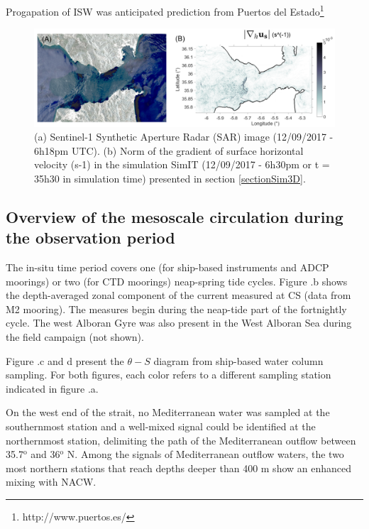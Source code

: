 \color{red}Progapation of ISW was anticipated prediction from Puertos del Estado\footnote{http://www.puertos.es/} \color{black}

\begin{figure}[!h]
 \includegraphics[width=\textwidth]{./GBR3D/Comp_SAR_IES.png}
 \caption {(a) Sentinel-1 Synthetic Aperture Radar (SAR) image (12/09/2017 - 6h18pm UTC). (b) Norm of the gradient of surface horizontal velocity (s-1) in the simulation SimIT (12/09/2017 - 6h30pm or t = 35h30 in simulation time) presented in section \ref{sectionSim3D}.}
 \label{fig_SARIES}
\end{figure}


\subsection{Overview of the mesoscale circulation during the observation period}

The in-situ time period covers one (for ship-based instruments and ADCP moorings) or two (for CTD moorings) neap-spring tide cycles. Figure .b shows the depth-averaged zonal component of the current measured at CS (data from M2 mooring). The measures begin during the neap-tide part of the fortnightly cycle. The west Alboran Gyre was also present in the West Alboran Sea during the field campaign (not shown). 

Figure .c and d present the $\theta-S$ diagram from ship-based water column sampling. For both figures, each color refers to a different sampling station indicated in figure .a.

On the west end of the strait, no Mediterranean water was sampled at the southernmost station and a well-mixed signal could be identified at the northernmost station, delimiting the path of the Mediterranean outflow between 35.7$^{\text{o}}$ and 36$^{\text{o}}$ N. Among the signals of Mediterranean outflow waters, the two most northern stations that reach depths \color{blue} deeper than 400 m show an enhanced mixing with \color{black} NACW.

